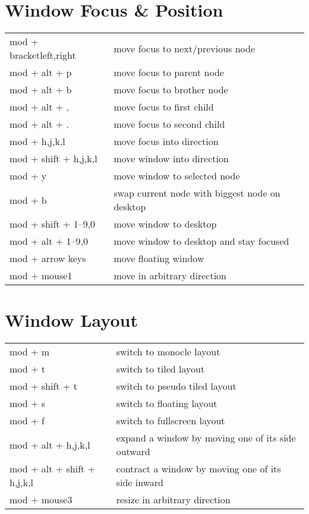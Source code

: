 \documentclass[
    10pt,
    a4paper,
    notitlepage,
]{scrartcl}
\begin{document}
\section{Window Focus \& Position}
\begin{tabular}{p{4cm}l}
    mod + bracket{left,right} & move focus to next/previous node               \\
    mod + alt + p             & move focus to parent node                      \\
    mod + alt + b             & move focus to brother node                     \\
    mod + alt + ,             & move focus to first child                      \\
    mod + alt + .             & move focus to second child                     \\
    mod + h,j,k,l             & move focus into direction                      \\
    mod + shift + h,j,k,l     & move window into direction                     \\
    mod + y                   & move window to selected node                   \\
    mod + b                   & swap current node with biggest node on desktop \\
    mod + shift + 1--9,0      & move window to desktop                         \\
    mod + alt + 1--9,0        & move window to desktop and stay focused        \\
    mod + arrow keys          & move floating window                           \\
    mod + mouse1              & move in arbitrary direction
\end{tabular}

\section{Window Layout}
\begin{tabular}{p{4cm}l}
    mod + m                         & switch to monocle layout                           \\
    mod + t                         & switch to tiled layout                             \\
    mod + shift + t                 & switch to pseudo tiled layout                      \\
    mod + s                         & switch to floating layout                          \\
    mod + f                         & switch to fullscreen layout                        \\
    mod + alt + h,j,k,l             & expand a window by moving one of its side outward  \\
    mod + alt + shift + h,j,k,l     & contract a window by moving one of its side inward \\
    mod + mouse3                    & resize in arbitrary direction
\end{tabular}
\end{document}
